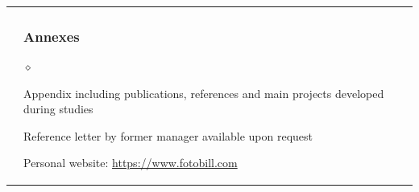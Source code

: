 \documentclass[a4paper]{article}
\def\sito{https://www.fotobill.com}
\newlength{\sectsep}
\newlength{\subsectsep}
\renewenvironment{itemize}{
  \begin{list}{$\diamond$}{
    \setlength{\topsep}{0.25em}
    \setlength{\itemsep}{0em}
    \setlength{\parskip}{0pt}
    \setlength{\parsep}{0em}
  }
}{
  \end{list}
}
\begin{document}
\begin{longtable}{r || l}
  & \begin{minipage}{0.9\textwidth}
      \vspace{\subsectsep}
      \subsubsection*{Annexes}
      \begin{itemize}
          \item Appendix including publications, references and main projects developed during studies
          \item Reference letter by former manager available upon request
          \item Personal website: \href{\sito}{\sito}
      \end{itemize}
      \vfill
    \end{minipage} \\

  \end{longtable}
\end{document}
